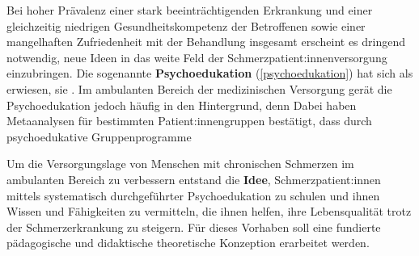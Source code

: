\documentclass[
  twoside,
  parskip=half-,
]{scrreprt}
\begin{document}
    Bei hoher Prävalenz einer stark beeinträchtigenden Erkrankung und einer gleichzeitig niedrigen Gesundheitskompetenz der Betroffenen sowie einer mangelhaften Zufriedenheit mit der Behandlung insgesamt erscheint es dringend notwendig, neue Ideen in das weite Feld der Schmerzpatient:innenversorgung einzubringen. Die sogenannte \textbf{Psychoedukation} (\autoref{psychoedukation}) hat sich als  erwiesen, sie . Im ambulanten Bereich der medizinischen Versorgung gerät die Psychoedukation jedoch häufig in den Hintergrund, denn   Dabei haben Metaanalysen für bestimmten Patient:innengruppen bestätigt, dass durch psychoedukative Gruppenprogramme  

    Um die Versorgungslage von Menschen mit chronischen Schmerzen im ambulanten Bereich zu verbessern entstand die \textbf{Idee}, Schmerzpatient:innen mittels systematisch durchgeführter Psychoedukation zu schulen und ihnen Wissen und Fähigkeiten zu vermitteln, die ihnen helfen, ihre Lebensqualität trotz der Schmerzerkrankung zu steigern. Für dieses Vorhaben soll eine fundierte pädagogische und didaktische theoretische Konzeption erarbeitet werden.
    
\end{document}
